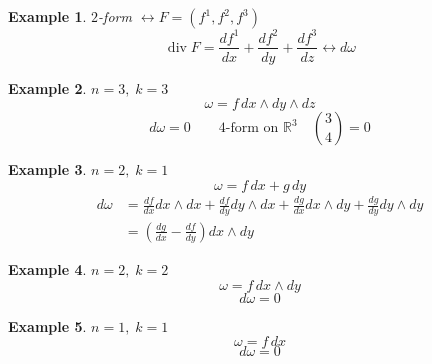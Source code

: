 \documentclass[11pt]{article}
\def\RR{\mathbb{R}}
\DeclareMathOperator{\dive}{div}
\newtheorem{example}{Example}[section]
\begin{document}
\begin{example} $2$-form $\leftrightarrow F=(f^1, f^2, f^3)$
\[\dive F = \frac{df^1}{dx} + \frac{df^2}{dy} + \frac{df^3}{dz} \leftrightarrow d\omega\]
\end{example}

\begin{example}
$n=3, \; k=3$
\[\omega = f \,dx\wedge dy \wedge dz\] 
\[d\omega = 0 \qquad \text{4-form on }\RR^3 \quad {3 \choose 4}=0\]
\end{example}

\begin{example}
$n=2, \;k=1$
\[\omega = f\, dx + g\,dy\]
\begin{align*}
d\omega &= \frac{df}{dx}dx\wedge dx + \frac{df}{dy}dy\wedge dx + \frac{dg}{dx}dx\wedge dy + \frac{dg}{dy}dy\wedge dy\\
&= \left(\frac{dg}{dx} -  \frac{df}{dy}\right)dx \wedge dy
\end{align*}
\end{example}

\begin{example}
$n=2, \;k=2$
\[\omega = f\, dx\wedge dy\]
\[d\omega =0\]
\end{example}
\begin{example}
$n=1, \;k=1$
\[\omega = f\, dx\]
\[d\omega =0\]
\end{example}
\end{document}
